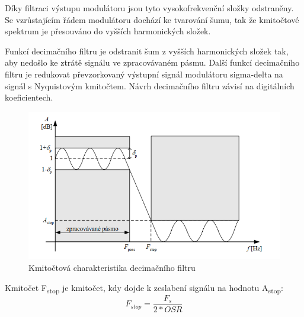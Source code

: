 Díky filtraci výstupu modulátoru jsou tyto vysokofrekvenční složky odstraněny. Se vzrůstajícím řádem modulátoru dochází ke tvarování šumu, tak že kmitočtové spektrum je přesouváno do vyšších harmonických složek.

Funkcí decimačního filtru je odstranit šum z vyšších harmonických složek tak, aby nedošlo ke ztrátě signálu ve zpracovávaném pásmu. Další funkcí decimačního filtru je redukovat převzorkovaný výstupní signál modulátoru sigma-delta na signál s Nyquistovým kmitočtem. Návrh decimačního filtru závisí na digitálních koeficientech.
\newpage
\begin{figure}[h]
   \begin{center}
     \includegraphics[scale=0.6]{images/decifiltr.png}
   \end{center}
   \caption{Kmitočtová charakteristika decimačního filtru}
\end{figure}

Kmitočet F\textsubscript{stop} je kmitočet, kdy dojde k zeslabení signálu na hodnotu A\textsubscript{stop}:
\begin{equation}
F_{stop}=\frac{F_{s}}{2*OSR}
\end{equation}






















